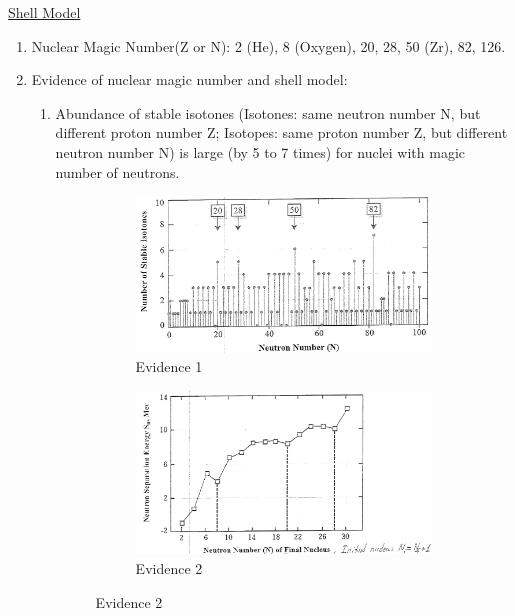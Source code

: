 \documentclass{school-22.101-notes}
\begin{document}
\clearpage
\uline{Shell Model}
\begin{enumerate}
\item Nuclear Magic Number(Z or N): 2 (He), 8 (Oxygen), 20, 28, 50 (Zr), 82, 126. 
\item Evidence of nuclear magic number and shell model:
\begin{enumerate}
\item Abundance of stable isotones (Isotones: same neutron number N, but different proton number Z; Isotopes: same proton number Z, but different neutron number N) is large (by 5 to 7 times) for nuclei with magic number of neutrons.
\begin{figure}[ht]
  \centering
  \begin{subfigure}[b]{0.45\textwidth}
    \centering
    \includegraphics[width=\textwidth]{images/shell/shell-evidence-1.png}
    \caption{Evidence 1}
    \label{fig:111}
  \end{subfigure}
  \begin{subfigure}[b]{0.45\textwidth}
    \centering
    \includegraphics[width=\textwidth]{images/shell/shell-evidence-2.png}
    \caption{Evidence 2}
    \label{fig:111}
  \end{subfigure}

\end{figure}
\end{enumerate}
\end{enumerate}
\end{document}
